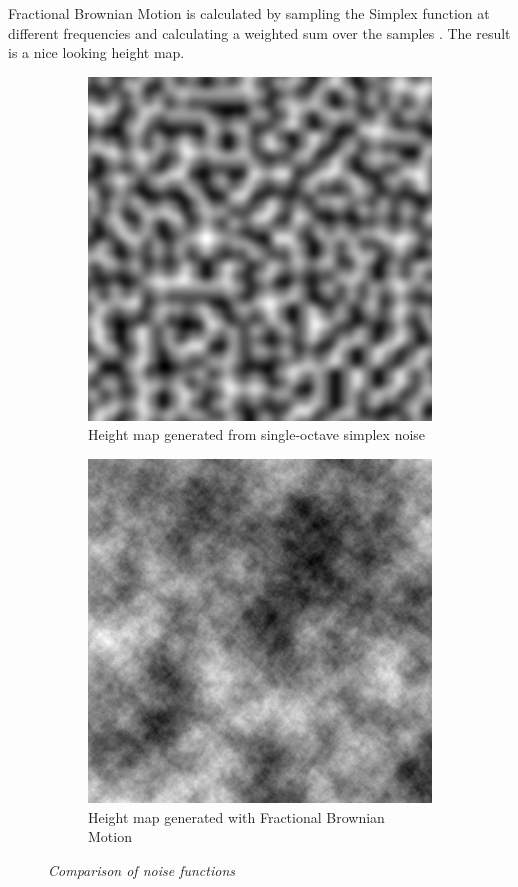 Fractional Brownian Motion is calculated by sampling the Simplex function at different frequencies and calculating a weighted sum over the samples \cite{FracBrownMotion}.  The result is a nice looking height map. 

\begin{figure}[H]
\begin{subfigure}{.5\textwidth}
  \centering
  \includegraphics[width=0.9\linewidth]{images/Simplex.png}
  \caption{Height map generated from single-octave simplex noise}
  \label{fig:sub1}
\end{subfigure}%
\begin{subfigure}{.5\textwidth}
  \centering
  \includegraphics[width=0.9\linewidth]{images/FracBrownMotion.png}
  \caption{Height map generated with Fractional Brownian Motion}
  \label{fig:sub2}
\end{subfigure}
\caption[Noise comparison]{\textit{Comparison of noise functions}}
\label{fig:R_kitchen_example}
\end{figure}

